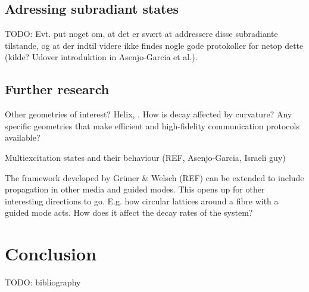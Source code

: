 \documentclass{article}
\begin{document}
\subsection{Adressing subradiant states}

TODO: Evt. put noget om, at det er svært at addressere disse subradiante tilstande, og at der indtil videre ikke findes nogle gode protokoller for netop dette (kilde? Udover introduktion in Asenjo-Garcia et al.). 

\subsection{Further research}\label{sec:further}

Other geometries of interest? Helix, . How is decay affected by curvature?
Any specific geometries that make efficient and high-fidelity communication protocols available?

Multiexcitation states and their behaviour (REF, Asenjo-Garcia, Israeli guy)

The framework developed by Grüner \& Welsch (REF) can be extended to include propagation in other media and guided modes. This opens up for other interesting directions to go. E.g. how circular lattices around a fibre with a guided mode acts. How does it affect the decay rates of the system? 

\section{Conclusion}

\newpage
TODO: bibliography
\end{document}
